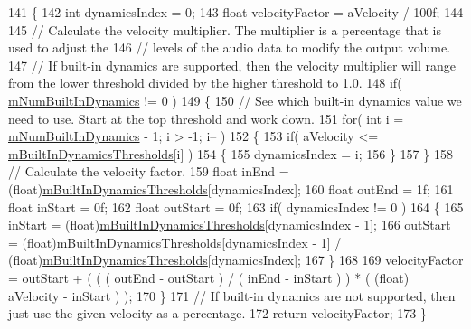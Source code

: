 \begin{DoxyCode}
141     \{
142         \textcolor{keywordtype}{int} dynamicsIndex = 0;
143         \textcolor{keywordtype}{float} velocityFactor = aVelocity / 100f;
144 
145         \textcolor{comment}{// Calculate the velocity multiplier. The multiplier is a percentage that is used to adjust the}
146         \textcolor{comment}{// levels of the audio data to modify the output volume. }
147         \textcolor{comment}{// If built-in dynamics are supported, then the velocity multiplier will range from the lower
       threshold divided by the higher threshold to 1.0.}
148         \textcolor{keywordflow}{if}( \hyperlink{group___v_i_base_pro_var_gac265f64f759d267ee1e1680f8d387011}{mNumBuiltInDynamics} != 0 )
149         \{
150             \textcolor{comment}{// See which built-in dynamics value we need to use. Start at the top threshold and work down.}
151             \textcolor{keywordflow}{for}( \textcolor{keywordtype}{int} i = \hyperlink{group___v_i_base_pro_var_gac265f64f759d267ee1e1680f8d387011}{mNumBuiltInDynamics} - 1; i > -1; i-- )
152             \{
153                 \textcolor{keywordflow}{if}( aVelocity <= \hyperlink{group___v_i_base_pro_var_gae3db4264dc2a96e99ea680c6d637e6bf}{mBuiltInDynamicsThresholds}[i] )
154                 \{
155                     dynamicsIndex = i;
156                 \}
157             \}
158             \textcolor{comment}{// Calculate the velocity factor.}
159             \textcolor{keywordtype}{float} inEnd = (float)\hyperlink{group___v_i_base_pro_var_gae3db4264dc2a96e99ea680c6d637e6bf}{mBuiltInDynamicsThresholds}[dynamicsIndex];
160             \textcolor{keywordtype}{float} outEnd = 1f;
161             \textcolor{keywordtype}{float} inStart = 0f;
162             \textcolor{keywordtype}{float} outStart = 0f;
163             \textcolor{keywordflow}{if}( dynamicsIndex != 0 )
164             \{
165                 inStart = (float)\hyperlink{group___v_i_base_pro_var_gae3db4264dc2a96e99ea680c6d637e6bf}{mBuiltInDynamicsThresholds}[dynamicsIndex - 1];
166                 outStart = (float)\hyperlink{group___v_i_base_pro_var_gae3db4264dc2a96e99ea680c6d637e6bf}{mBuiltInDynamicsThresholds}[dynamicsIndex - 1] /
       (\textcolor{keywordtype}{float})\hyperlink{group___v_i_base_pro_var_gae3db4264dc2a96e99ea680c6d637e6bf}{mBuiltInDynamicsThresholds}[dynamicsIndex];
167             \}
168 
169             velocityFactor = outStart + ( ( ( outEnd - outStart ) / ( inEnd - inStart ) ) * ( (\textcolor{keywordtype}{float})
      aVelocity - inStart ) );
170         \}
171         \textcolor{comment}{// If built-in dynamics are not supported, then just use the given velocity as a percentage. }
172         \textcolor{keywordflow}{return} velocityFactor;
173     \}
\end{DoxyCode}
\mbox{\label{group___v_i_base_pub_func_gaf715f7c3bbd2f1a2fa543b2f0684f8a6}} 
